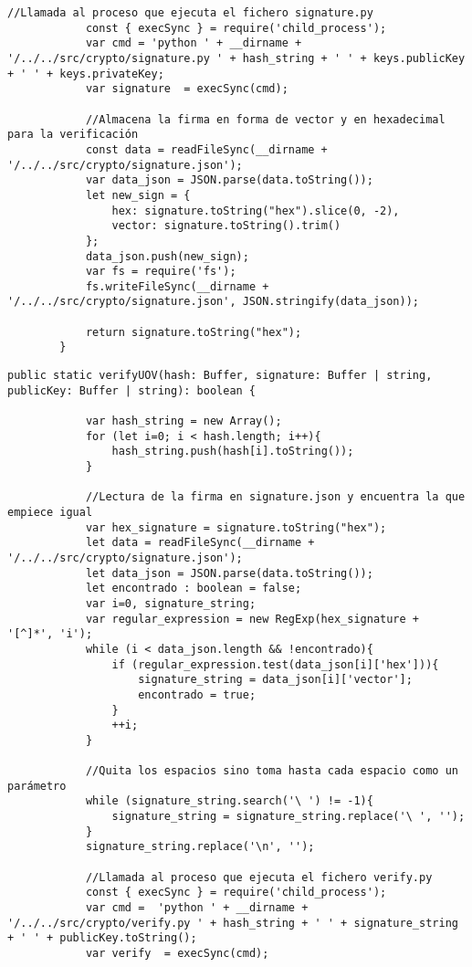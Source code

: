 \begin{itemize}
\begin{lstlisting}[caption=Modificación archivo \texttt{hash.ts} función \texttt{signUOV}, label=cod:hash-UOV-sign, style=TypeScript]
			//Llamada al proceso que ejecuta el fichero signature.py
			const { execSync } = require('child_process');
			var cmd = 'python ' + __dirname + '/../../src/crypto/signature.py ' + hash_string + ' ' + keys.publicKey + ' ' + keys.privateKey;
			var signature  = execSync(cmd);

			//Almacena la firma en forma de vector y en hexadecimal para la verificación
			const data = readFileSync(__dirname + '/../../src/crypto/signature.json');
			var data_json = JSON.parse(data.toString());
			let new_sign = {
				hex: signature.toString("hex").slice(0, -2),
				vector: signature.toString().trim()
			};
			data_json.push(new_sign);
			var fs = require('fs');
			fs.writeFileSync(__dirname + '/../../src/crypto/signature.json', JSON.stringify(data_json));

			return signature.toString("hex");
		}
	\end{lstlisting}
	\newpage

	\begin{lstlisting}[caption=Modificación archivo \texttt{hash.ts} función verifyUOV, label=cod:hash-UOV-verif, style=TypeScript]
		public static verifyUOV(hash: Buffer, signature: Buffer | string, publicKey: Buffer | string): boolean {

			var hash_string = new Array();
			for (let i=0; i < hash.length; i++){
				hash_string.push(hash[i].toString());
			}

			//Lectura de la firma en signature.json y encuentra la que empiece igual
			var hex_signature = signature.toString("hex");
			let data = readFileSync(__dirname + '/../../src/crypto/signature.json');
			let data_json = JSON.parse(data.toString());
			let encontrado : boolean = false;
			var i=0, signature_string;
			var regular_expression = new RegExp(hex_signature + '[^]*', 'i');
			while (i < data_json.length && !encontrado){
				if (regular_expression.test(data_json[i]['hex'])){
					signature_string = data_json[i]['vector'];
					encontrado = true;
				}
				++i;
			}
		
			//Quita los espacios sino toma hasta cada espacio como un parámetro
			while (signature_string.search('\ ') != -1){
				signature_string = signature_string.replace('\ ', '');
			}
			signature_string.replace('\n', '');
		
			//Llamada al proceso que ejecuta el fichero verify.py
			const { execSync } = require('child_process');
			var cmd =  'python ' + __dirname + '/../../src/crypto/verify.py ' + hash_string + ' ' + signature_string + ' ' + publicKey.toString();
			var verify  = execSync(cmd);


\end{lstlisting}
\end{itemize}
